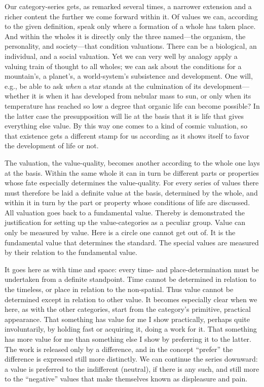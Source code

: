 \documentclass[12pt,a4paper]{book}
\newcommand{\opage}[1]{\marginnote{\footnotesize\textit{[#1]}}}
\begin{document}
Our category-series gets, as remarked several times, a narrower extension and
a richer content the further we come forward within it. Of values we can,
according to the given definition, speak only where a formation of a whole has
taken place. And within the wholes it is directly only the three named---the
organism, the personality, and society---that condition valuations. There can
be a biological, an individual, and a social valuation. Yet we can very well
by analogy apply a valuing train of thought to all wholes; we can ask about
the conditions for a mountain's, a planet's, a world-system's subsistence and
development. One will, e.g., be able to ask \emph{when} a star stands at the
culmination of its development---whether it is when it has developed from
nebular mass to sun, or only when its temperature has reached so low a degree
that organic life can become possible? In the latter case the presupposition
will lie at the basis that it is life that gives everything else value. By
this \opage{240}way one comes to a kind of cosmic valuation, so that existence gets a
different stamp for us according as it shows itself to favor the development
of life or not.

The valuation, the value-quality, becomes another according to the whole one
lays at the basis. Within the same whole it can in turn be different parts or
properties whose fate especially determines the value-quality. For every
series of values there must therefore be laid a definite value at the basis,
determined by the whole, and within it in turn by the part or property whose
conditions of life are discussed. All valuation goes back to a fundamental
value. Thereby is demonstrated the justification for setting up the
value-categories as a peculiar group. Value can only be measured by value.
Here is a circle one cannot get out of. It is the fundamental value that
determines the standard. The special values are measured by their relation to
the fundamental value.

It goes here as with time and space: every time- and place-determination must
be undertaken from a definite standpoint. Time cannot be determined in
relation to the timeless, or place in relation to the non-spatial. Thus value
cannot be determined except in relation to other value. It becomes especially
clear when we here, as with the other categories, start from the category's
primitive, practical appearance. That something has value for me I show
practically, perhaps quite involuntarily, by holding fast or acquiring it,
doing a work for it. That something has more value for me than something else
I show by preferring it to the latter. The work is released only by a
difference, and in the concept ``prefer'' the difference is expressed still
more distinctly. We can continue the series downward: a value is preferred to
the indifferent (neutral), if there is any such, and still more to the
``negative'' values that make themselves known as displeasure and pain.
\end{document}
